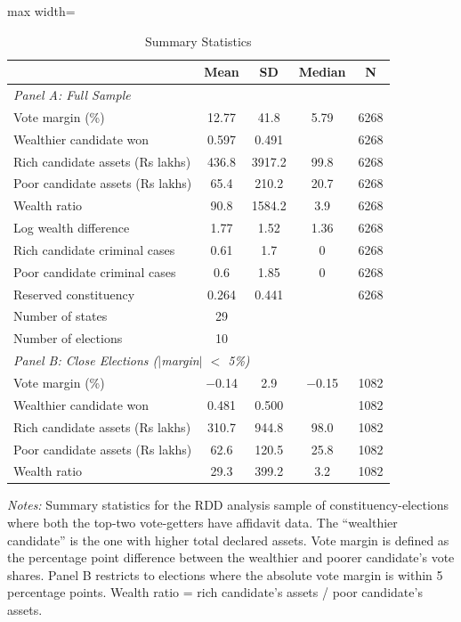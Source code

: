 \begin{table}[htbp]
\centering
\caption{Summary Statistics}
\label{tab:summary}
\begin{adjustbox}{max width=\textwidth}
\begin{tabular}{lcccc}
\hline\hline
 & Mean & SD & Median & N \\
\hline
\multicolumn{5}{l}{\textit{Panel A: Full Sample}} \\
Vote margin (\%) & 12.77 & 41.8 & 5.79 & 6268 \\
Wealthier candidate won & 0.597 & 0.491 &  & 6268 \\
Rich candidate assets (Rs lakhs) & 436.8 & 3917.2 & 99.8 & 6268 \\
Poor candidate assets (Rs lakhs) & 65.4 & 210.2 & 20.7 & 6268 \\
Wealth ratio & 90.8 & 1584.2 & 3.9 & 6268 \\
Log wealth difference & 1.77 & 1.52 & 1.36 & 6268 \\
Rich candidate criminal cases & 0.61 & 1.7 & 0 & 6268 \\
Poor candidate criminal cases & 0.6 & 1.85 & 0 & 6268 \\
Reserved constituency & 0.264 & 0.441 &  & 6268 \\
Number of states & 29 &  &  &  \\
Number of elections & 10 &  &  &  \\
\hline
\multicolumn{5}{l}{\textit{Panel B: Close Elections ($|$margin$|$ $<$ 5\%)}} \\
Vote margin (\%) & $-$0.14 & 2.9 & $-$0.15 & 1082 \\
Wealthier candidate won & 0.481 & 0.500 &  & 1082 \\
Rich candidate assets (Rs lakhs) & 310.7 & 944.8 & 98.0 & 1082 \\
Poor candidate assets (Rs lakhs) & 62.6 & 120.5 & 25.8 & 1082 \\
Wealth ratio & 29.3 & 399.2 & 3.2 & 1082 \\
\hline\hline
\end{tabular}
\end{adjustbox}
\begin{minipage}{0.95\textwidth}
\footnotesize
\textit{Notes:} Summary statistics for the RDD analysis sample of constituency-elections where both the top-two vote-getters have affidavit data. The ``wealthier candidate'' is the one with higher total declared assets. Vote margin is defined as the percentage point difference between the wealthier and poorer candidate's vote shares. Panel B restricts to elections where the absolute vote margin is within 5 percentage points. Wealth ratio = rich candidate's assets / poor candidate's assets.
\end{minipage}
\end{table}
